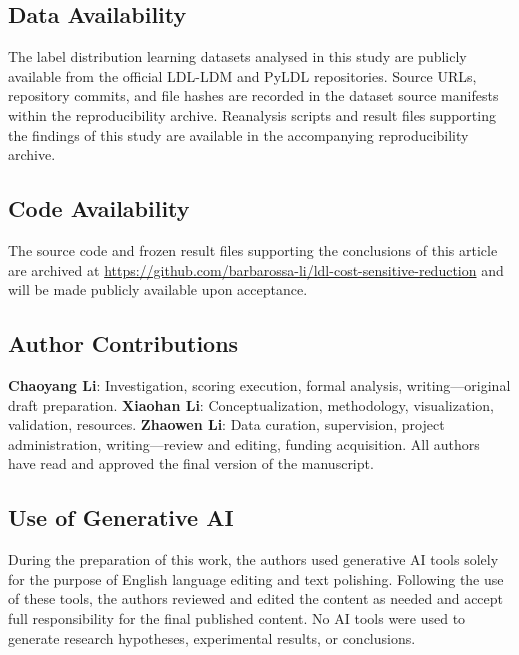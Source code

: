 \subsection*{Data Availability}
The label distribution learning datasets analysed in this study are publicly available from the official LDL-LDM and PyLDL repositories. Source URLs, repository commits, and file hashes are recorded in the dataset source manifests within the reproducibility archive. Reanalysis scripts and result files supporting the findings of this study are available in the accompanying reproducibility archive.

\subsection*{Code Availability}
The source code and frozen result files supporting the conclusions of this article are archived at \url{https://github.com/barbarossa-li/ldl-cost-sensitive-reduction} and will be made publicly available upon acceptance.

\subsection*{Author Contributions}
\textbf{Chaoyang Li}: Investigation, scoring execution, formal analysis, writing---original draft preparation. \textbf{Xiaohan Li}: Conceptualization, methodology,  visualization, validation, resources. \textbf{Zhaowen Li}: Data curation, supervision, project administration, writing---review and editing, funding acquisition.  All authors have read and approved the final version of the manuscript.

\subsection*{Use of Generative AI}
During the preparation of this work, the authors used generative AI tools solely for the purpose of English language editing and text polishing. Following the use of these tools, the authors reviewed and edited the content as needed and accept full responsibility for the final published content. No AI tools were used to generate research hypotheses, experimental results, or conclusions.
